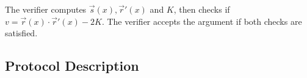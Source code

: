 The verifier computes $\vec{s}(x), \vec{r}'(x) $ and $K$, then checks if $v = \vec{r}(x) \cdot \vec{r}'(x)-2K$.
%
The verifier accepts the argument if both checks are satisfied.

\subsection{Protocol Description}

